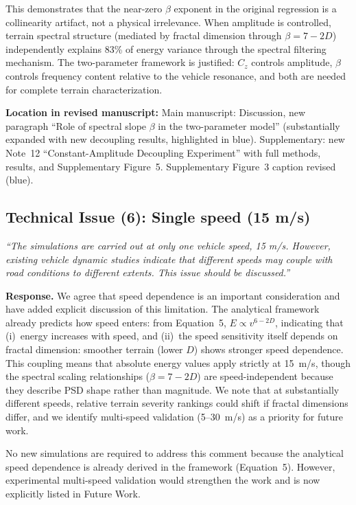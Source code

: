 \documentclass[11pt]{article}
\newcommand{\revquote}[1]{\medskip\noindent\textit{``#1''}\medskip}
\newcommand{\revloc}[1]{\noindent\textbf{Location in revised manuscript:} #1\medskip}
\begin{document}
\noindent This demonstrates that the near-zero $\beta$ exponent in the original regression is a collinearity artifact, not a physical irrelevance. When amplitude is controlled, terrain spectral structure (mediated by fractal dimension through $\beta = 7-2D$) independently explains 83\% of energy variance through the spectral filtering mechanism. The two-parameter framework is justified: $C_z$ controls amplitude, $\beta$ controls frequency content relative to the vehicle resonance, and both are needed for complete terrain characterization.

\revloc{Main manuscript: Discussion, new paragraph ``Role of spectral slope $\beta$ in the two-parameter model'' (substantially expanded with new decoupling results, highlighted in blue). Supplementary: new Note~12 ``Constant-Amplitude Decoupling Experiment'' with full methods, results, and Supplementary Figure~5. Supplementary Figure~3 caption revised (blue).}

\bigskip

\subsection*{Technical Issue (6): Single speed (15 m/s)}

\revquote{The simulations are carried out at only one vehicle speed, 15 m/s. However, existing vehicle dynamic studies indicate that different speeds may couple with road conditions to different extents. This issue should be discussed.}

\noindent\textbf{Response.} We agree that speed dependence is an important consideration and have added explicit discussion of this limitation. The analytical framework already predicts how speed enters: from Equation~5, $E \propto v^{6-2D}$, indicating that (i)~energy increases with speed, and (ii)~the speed sensitivity itself depends on fractal dimension: smoother terrain (lower $D$) shows stronger speed dependence. This coupling means that absolute energy values apply strictly at 15~m/s, though the spectral scaling relationships ($\beta = 7-2D$) are speed-independent because they describe PSD shape rather than magnitude. We note that at substantially different speeds, relative terrain severity rankings could shift if fractal dimensions differ, and we identify multi-speed validation (5--30~m/s) as a priority for future work.

No new simulations are required to address this comment because the analytical speed dependence is already derived in the framework (Equation~5). However, experimental multi-speed validation would strengthen the work and is now explicitly listed in Future Work.
\end{document}
